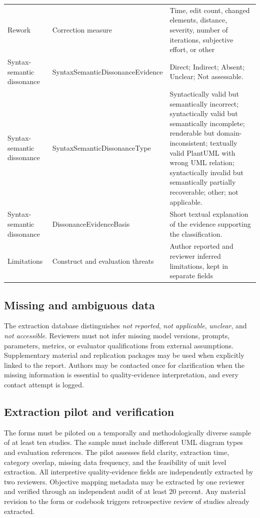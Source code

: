 \begin{longtable}{p{} p{} p{}}
Rework & Correction measure & Time, edit count, changed elements, distance, severity, number of iterations, subjective effort, or other \\
Syntax-semantic dissonance & SyntaxSemanticDissonanceEvidence & Direct; Indirect; Absent; Unclear; Not assessable. \\
Syntax-semantic dissonance & SyntaxSemanticDissonanceType & Syntactically valid but semantically incorrect; syntactically valid but semantically incomplete; renderable but domain-inconsistent; textually valid PlantUML with wrong UML relation; syntactically invalid but semantically partially recoverable; other; not applicable. \\
Syntax-semantic dissonance & DissonanceEvidenceBasis & Short textual explanation of the evidence supporting the classification. \\
Limitations & Construct and evaluation threats & Author reported and reviewer inferred limitations, kept in separate fields \\
\bottomrule
\end{longtable}

\subsection{Missing and ambiguous data}

The extraction database distinguishes \textit{not reported}, \textit{not applicable}, \textit{unclear}, and \textit{not accessible}. Reviewers must not infer missing model versions, prompts, parameters, metrics, or evaluator qualifications from external assumptions. Supplementary material and replication packages may be used when explicitly linked to the report. Authors may be contacted once for clarification when the missing information is essential to quality-evidence interpretation, and every contact attempt is logged.

\subsection{Extraction pilot and verification}

The forms must be piloted on a temporally and methodologically diverse sample of at least ten studies. The sample must include different UML diagram types and evaluation references. The pilot assesses field clarity, extraction time, category overlap, missing data frequency, and the feasibility of unit level extraction. All interpretive quality-evidence fields are independently extracted by two reviewers. Objective mapping metadata may be extracted by one reviewer and verified through an independent audit of at least 20 percent. Any material revision to the form or codebook triggers retrospective review of studies already extracted.

